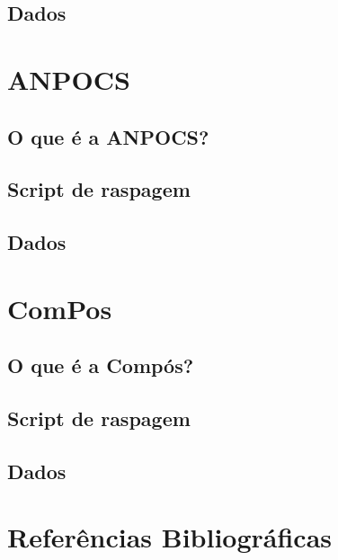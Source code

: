 \documentclass[
]{book}
\begin{document}
\hypertarget{dados}{%
\section{Dados}\label{dados}}

\hypertarget{anpocs}{%
\chapter{ANPOCS}\label{anpocs}}

\hypertarget{o-que-uxe9-a-anpocs}{%
\section{O que é a ANPOCS?}\label{o-que-uxe9-a-anpocs}}

\hypertarget{script-de-raspagem-1}{%
\section{Script de raspagem}\label{script-de-raspagem-1}}

\hypertarget{dados-1}{%
\section{Dados}\label{dados-1}}

\hypertarget{compos}{%
\chapter{ComPos}\label{compos}}

\hypertarget{o-que-uxe9-a-compuxf3s}{%
\section{O que é a Compós?}\label{o-que-uxe9-a-compuxf3s}}

\hypertarget{script-de-raspagem-2}{%
\section{Script de raspagem}\label{script-de-raspagem-2}}

\hypertarget{dados-2}{%
\section{Dados}\label{dados-2}}

\hypertarget{referuxeancias-bibliogruxe1ficas}{%
\chapter{Referências Bibliográficas}\label{referuxeancias-bibliogruxe1ficas}}
\end{document}

